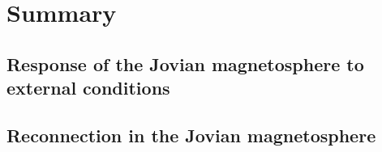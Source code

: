 \chapter{Summary}

\section{Response of the Jovian magnetosphere to external conditions}
\section{Reconnection in the Jovian magnetosphere }